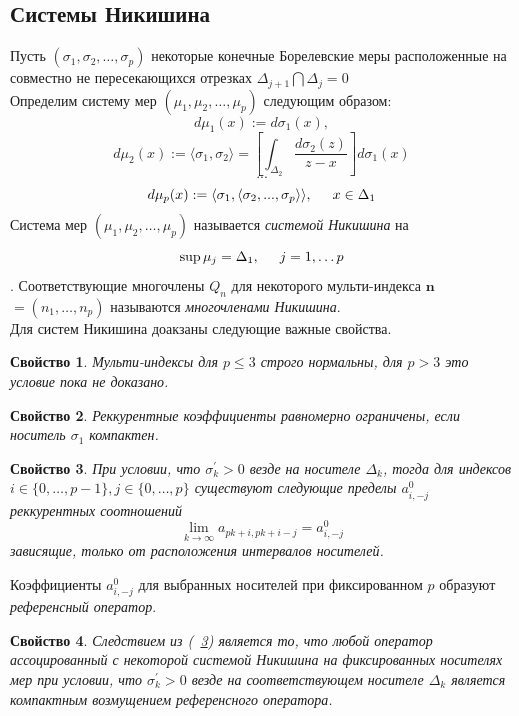 \documentclass{report}
\newtheorem{prope}{Свойство} [chapter]
\begin{document}
\subsection {Системы Никишина}
Пусть $(\sigma_1,\sigma_2,\ldots,\sigma_p)$ некоторые конечные Борелевские меры расположенные на совместно не пересекающихся отрезках 
$\Delta_{j+1} \bigcap \Delta_j =0$ \\
Определим систему мер $(\mu_1, \mu_2,\ldots,\mu_p)$ следующим образом:
$$
 d\mu_1(x) := d\sigma_1 (x),
$$
$$
d\mu_2(x) :=  \langle \sigma_1, \sigma_2 \rangle = \left[ \int_{\Delta_2} \displaystyle\frac{d\sigma_2(z)}{z-x} \right] d\sigma_1(x)
$$
$$
 ...
$$
$$
d\mu_p(x) :=  \langle \sigma_1, \langle \sigma_2, ..., \sigma_p \rangle \rangle, \hspace{0.5cm} x \in \Delta_1 
$$
Система мер $(\mu_1,\mu_2,\ldots,\mu_p)$ называется \emph {системой Никишина}  на 
$$\sup \mu_j = \Delta_1, \hspace{0.5cm} j=1,\ldots p$$.
Соответствующие многочлены $Q_n$ для некоторого мульти-индекса $\textbf {n} $ $=(n_1,\ldots,n_p)$ называются \emph {многочленами Никишина}.  \\
Для систем Никишина доакзаны следующие важные свойства.
\begin{prope}
Мульти-индексы для $p \leq 3$ строго нормальны, для $p > 3$ это условие пока не доказано.
\end{prope}
\begin{prope}
Реккурентные коэффициенты равномерно ограничены, если носитель $\sigma_1$ компактен.
\end{prope}
\begin{prope}
\label{Nikishin.Limits}
При условии, что $\sigma_k^{'} >0$ везде на носителе $\Delta_k$, тогда для индексов $i \in \{0,\ldots,p-1\}, j \in \{0,\dots,p\}$ существуют следующие пределы $a_{i,-j}^{0}$  реккурентных соотношений
$$
\lim\limits_{k \rightarrow \infty} a_{pk+i, pk+i-j}=a_{i,-j}^{0}
$$
зависящие, только от расположения интервалов носителей.
\end{prope}
Коэффициенты $a_{i,-j}^{0}$ для выбранных носителей при фиксированном $p$ образуют \emph {референсный оператор}. 
\begin{prope}
Следствием из (~\ref{Nikishin.Limits}) является то, что любой оператор ассоцированный с некоторой системой Никишина на фиксированных носителях мер при условии, что $\sigma_k^{'} >0$ везде на соответствующем носителе $\Delta_k$ является компактным возмущением референсного оператора. 
\end{prope}
\end{document}
